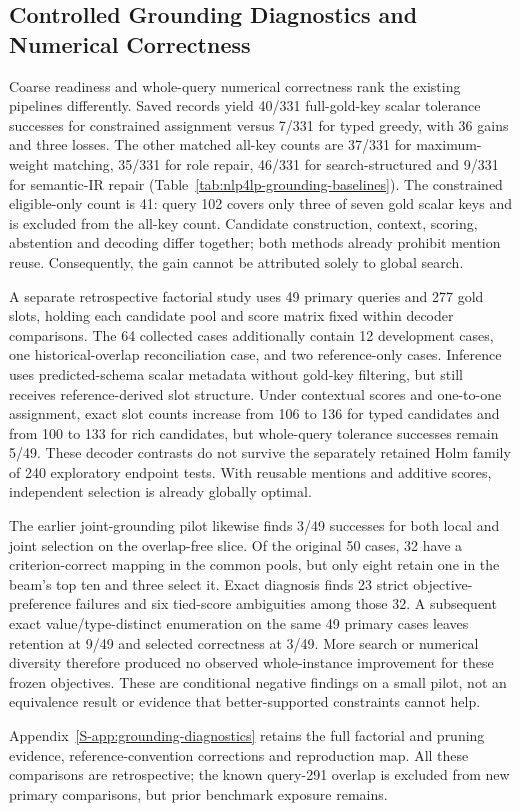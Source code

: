 \subsection{Controlled Grounding Diagnostics and Numerical Correctness}
\label{subsec:grounding-followup}

Coarse readiness and whole-query numerical correctness rank the existing
pipelines differently. Saved records yield 40/331 full-gold-key scalar
tolerance successes for constrained assignment versus 7/331 for typed greedy,
with 36 gains and three losses. The other matched all-key counts are 37/331 for maximum-weight matching, 35/331 for role repair, 46/331 for search-structured and 9/331 for semantic-IR repair (Table~\ref{tab:nlp4lp-grounding-baselines}). The constrained eligible-only count is 41:
query 102 covers only three of seven gold scalar keys and is excluded from
the all-key count. Candidate construction, context, scoring, abstention and
decoding differ together; both methods already prohibit mention reuse.
Consequently, the gain cannot be attributed solely to global search.

A separate retrospective factorial study uses 49 primary queries and 277
gold slots, holding each candidate pool and score matrix fixed within
decoder comparisons. The 64 collected cases additionally contain 12
development cases, one historical-overlap reconciliation case, and two
reference-only cases. Inference uses predicted-schema scalar metadata
without gold-key filtering, but still receives reference-derived slot structure. Under contextual scores and one-to-one
assignment, exact slot counts increase from 106 to 136 for typed candidates
and from 100 to 133 for rich candidates, but whole-query tolerance successes
remain 5/49. These decoder contrasts do not survive the separately retained
Holm family of 240 exploratory endpoint tests. With reusable mentions and
additive scores, independent selection is already globally optimal.

The earlier joint-grounding pilot likewise finds 3/49 successes for both
local and joint selection on the overlap-free slice. Of the original 50
cases, 32 have a criterion-correct mapping in the common pools, but only
eight retain one in the beam's top ten and three select it. Exact diagnosis
finds 23 strict objective-preference failures and six tied-score ambiguities
among those 32. A subsequent exact value/type-distinct enumeration on the
same 49 primary cases leaves retention at 9/49 and selected correctness at
3/49. More search or numerical diversity therefore produced no observed
whole-instance improvement for these frozen objectives. These are conditional negative findings on a small pilot, not an equivalence result or evidence that better-supported constraints cannot help.

Appendix~\ref{S-app:grounding-diagnostics} retains the full factorial and
pruning evidence, reference-convention corrections and reproduction map.
All these comparisons are retrospective; the known query-291 overlap is
excluded from new primary comparisons, but prior benchmark exposure remains.
